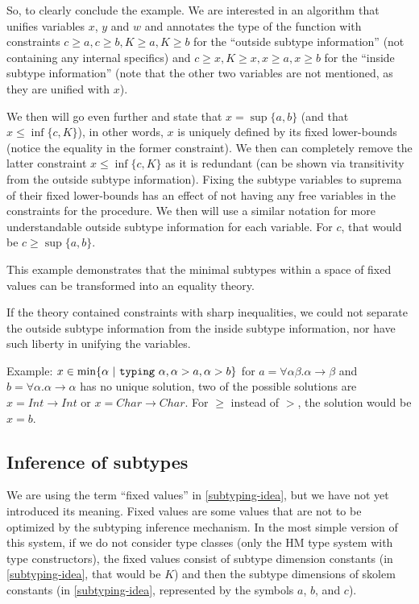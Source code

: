 So, to clearly conclude the example. We are interested in an algorithm that unifies variables $x$, $y$ and $w$ and annotates the type of the function with constraints $c \geq a, c \geq b, K \geq a, K \geq b$ for the ``outside subtype information'' (not containing any internal specifics) and $c \geq x, K \geq x, x \geq a, x \geq b$ for the ``inside subtype information'' (note that the other two variables are not mentioned, as they are unified with $x$).

We then will go even further and state that $x = \sup \{a, b\}$ (and that $x \leq \inf \{c, K\}$), in other words, $x$ is uniquely defined by its fixed lower-bounds (notice the equality in the former constraint). We then can completely remove the latter constraint $x \leq \inf \{c, K\}$ as it is redundant (can be shown via transitivity from the outside subtype information). Fixing the subtype variables to suprema of their fixed lower-bounds has an effect of not having any free variables in the constraints for the procedure. We then will use a similar notation for more understandable outside subtype information for each variable. For $c$, that would be $c \geq \sup \{a, b\}$.

This example demonstrates that the minimal subtypes within a space of fixed values can be transformed into an equality theory.

\begin{remark}
    If the theory contained constraints with sharp inequalities, we could not separate the outside subtype information from the inside subtype information, nor have such liberty in unifying the variables.

    Example: $x \in \min \{ \alpha \ |\  \mathtt{typing}\ \alpha, \alpha > a, \alpha > b \}$ for $a = \forall \alpha \beta . \alpha \to \beta$ and $b = \forall \alpha . \alpha \to \alpha$ has no unique solution, two of the possible solutions are $x = Int \to Int$ or $x = Char \to Char$. For $\geq$ instead of $>$, the solution would be $x = b$.
\end{remark}

\subsection{Inference of subtypes}
\label{sec:inferSub}

We are using the term ``fixed values'' in \cref{subtyping-idea}, but we have not yet introduced its meaning. Fixed values are some values that are not to be optimized by the subtyping inference mechanism. In the most simple version of this system, if we do not consider type classes (only the HM type system with type constructors), the fixed values consist of subtype dimension constants (in \cref{subtyping-idea}, that would be $K$) and then the subtype dimensions of skolem constants (in \cref{subtyping-idea}, represented by the symbols $a$, $b$, and $c$).

